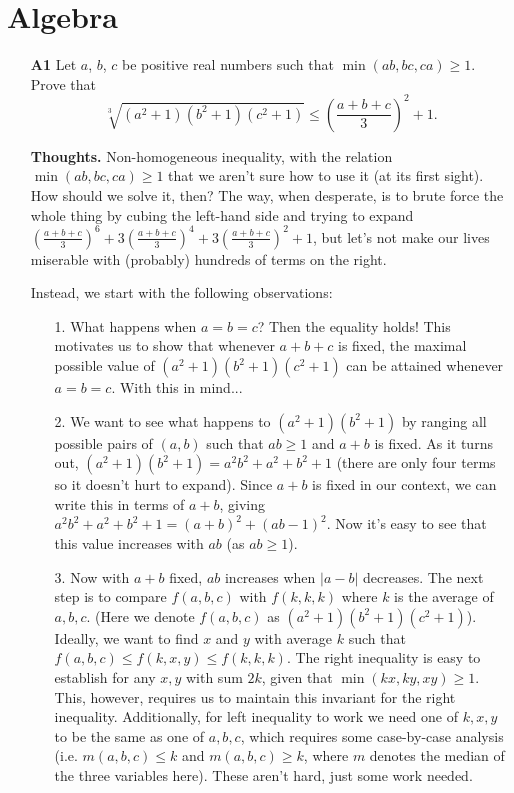 \documentclass[11pt,a4paper]{article}
\begin{document}
\section{Algebra}
\begin{itemize}
\item[\textbf{A1}]
Let $a$, $b$, $c$ be positive real numbers such that $\min(ab,bc,ca) \ge 1$. Prove that $$\sqrt[3]{(a^2+1)(b^2+1)(c^2+1)} \le \left(\frac{a+b+c}{3}\right)^2 + 1.$$

\textbf{Thoughts.} 
Non-homogeneous inequality, with the relation $\min(ab,bc,ca) \ge 1$ that we aren't sure how to use it (at its first sight). 
How should we solve it, then? 
The way, when desperate, is to brute force the whole thing by cubing the left-hand side and trying to expand 
$\left(\frac{a+b+c}{3}\right)^6+3\left(\frac{a+b+c}{3}\right)^4+3\left(\frac{a+b+c}{3}\right)^2+1$, 
but let's not make our lives miserable with (probably) hundreds of terms on the right. 

Instead, we start with the following observations: 
\begin{itemize}
\item [1.] What happens when $a=b=c$? Then the equality holds! 
This motivates us to show that whenever $a+b+c$ is fixed, the maximal possible value of $(a^2+1)(b^2+1)(c^2+1)$ can be attained whenever $a=b=c$. With this in mind...
\item [2.] We want to see what happens to $(a^2+1)(b^2+1)$ by ranging all possible pairs of $(a,b)$ such that $ab\ge 1$ and $a+b$ is fixed. 
As it turns out, $(a^2+1)(b^2+1)=a^2b^2+a^2+b^2+1$ (there are only four terms so it doesn't hurt to expand). 
Since $a+b$ is fixed in our context, we can write this in terms of $a+b$, giving 
$a^2b^2+a^2+b^2+1=(a+b)^2+(ab-1)^2$. 
Now it's easy to see that this value increases with $ab$ (as $ab\ge 1$). 
\item [3.] Now with $a+b$ fixed, $ab$ increases when $|a-b|$ decreases. 
The next step is to compare $f(a,b,c)$ with $f(k,k,k)$ where $k$ is the average of $a,b,c$. 
(Here we denote $f(a,b,c)$ as $(a^2+1)(b^2+1)(c^2+1)$). 
Ideally, we want to find $x$ and $y$ with average $k$ such that 
$f(a,b,c)\le f(k,x,y)\le f(k,k,k)$. 
The right inequality is easy to establish for any $x, y$ with sum $2k$, given that $\min(kx, ky, xy)\ge 1$. 
This, however, requires us to maintain this invariant for the right inequality. 
Additionally, for left inequality to work we need one of $k, x, y$ to be the same as one of $a, b, c$, 
which requires some case-by-case analysis (i.e. $m(a,b,c)\le k$ and $m(a,b,c)\ge k$, where $m$ denotes the median of the three variables here). 
These aren't hard, just some work needed. 
\end{itemize}


\end{itemize}
\end{document}
